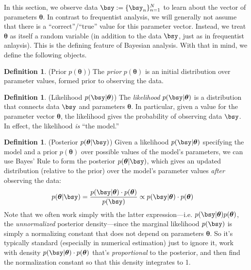 \documentclass[12pt]{article}
\theoremstyle{plain}
\theoremstyle{definition}
\newtheorem{defn}[thm]{Definition}
\theoremstyle{remark}
\newcommand{\bstheta}{\boldsymbol{\theta}}
\newcommand{\nN}{_{n=1}^N}
\begin{document}


In this section, we observe data $\bsy:=\{\bsy_n\}\nN$ to learn
about the vector of parameters $\bstheta$.
In contrast to frequentist analysis, we will generally not assume that
there is a ``correct''/``true'' value for this parameter vector. Instead,
we treat $\bstheta$ as itself a random variable (in addition to the data
$\bsy$, just as in frequentist anlaysis).
This is the defining feature of Bayesian analysis. With that in mind, we
define the following objects.

\begin{defn}(Prior $p(\bstheta)$)
The \emph{prior} $p(\bstheta)$ is an initial distribution over parameter
values, formed prior to observing the data.
\end{defn}

\begin{defn}(Likelihood $p(\bsy|\bstheta)$)
The \emph{likelihood} $p(\bsy|\bstheta)$ is a distribution that
connects data $\bsy$ and parameters $\bstheta$.
In particular, given a value for the parameter vector $\bstheta$, the
likelihood gives the probability of observing data $\bsy$.
In effect, the likelihood \emph{is} ``the model.''
\end{defn}


\begin{defn}(Posterior $p(\bstheta|\bsy)$)
Given a likelihood $p(\bsy|\bstheta)$ specifying the model and a
prior $p(\bstheta)$ over possible values of the model's parameters, we
can use Bayes' Rule to form the posterior $p(\bstheta|\bsy)$,
which gives an updated distribution (relative to the prior) over
the model's parameter values \emph{after} observing the data:
\begin{align*}
  p(\bstheta|\bsy)
  &=
  \frac{p(\bsy|\bstheta)\cdot p(\bstheta)}{p(\bsy)}
  \propto
  p(\bsy|\bstheta)\cdot p(\bstheta)
  \label{bayes}
\end{align*}
Note that we often work simply with the latter expression---i.e.
$p(\bsy|\bstheta)p(\bstheta)$, the \emph{unnormalized} posterior
density---since the marginal likelihood $p(\bsy)$ is simply a
normalizing constant that does not depend on parameters $\bstheta$.
So it's typically standard (especially in numerical estimation) just to
ignore it, work with density $p(\bsy|\bstheta)\cdot p(\bstheta)$
that's \emph{proportional} to the posterior, and then find the
normalization constant so that this density integrates to 1.
\end{defn}
\end{document}
